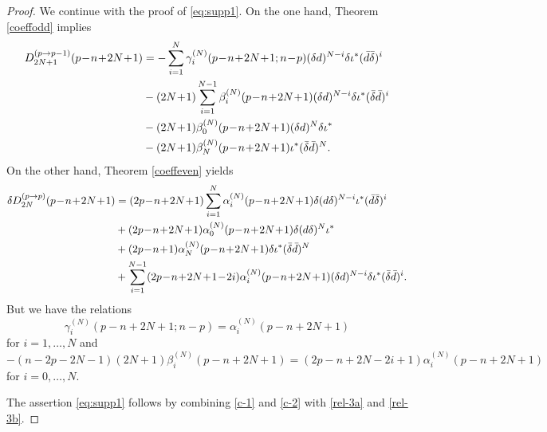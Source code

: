 \documentclass[a4paper,12pt,reqno]{amsart}
\numberwithin{theorem}{subsection}
\numberwithin{equation}{section}
\begin{document}
\begin{proof}
We continue with the proof of \eqref{eq:supp1}. On the one hand, Theorem
\ref{coeffodd} implies
\begin{align}\label{c-1}
   D_{2N+1}^{(p \to p-1)}(p\!-\!n\!+\!2N\!+\!1) & = -\sum_{i=1}^N \gamma_i^{(N)}(p\!-\!n\!+\!2N\!+\!1;n\!-\!p)
   (\delta {d})^{N-i} \delta \iota^* (\bar{d} \bar{\delta})^i \notag \\
   & - (2N\!+\!1) \sum_{i=1}^{N-1} \beta_i^{(N)}(p\!-\!n\!+\!2N\!+\!1)
   (\delta {d})^{N-i} \delta \iota^* (\bar{\delta} \bar{d})^i \notag \\
   & - (2N\!+\!1) \beta_0^{(N)}(p\!-\!n\!+\!2N\!+\!1) (\delta {d})^N \delta \iota^* \notag\\
   & - (2N\!+\!1) \beta_N^{(N)}(p\!-\!n\!+\!2N\!+\!1) \iota^* (\bar{\delta}
   \bar{d})^N.
\end{align}
On the other hand, Theorem \ref{coeffeven} yields
\begin{align}\label{c-2}
   \delta D_{2N}^{(p \to p)}(p\!-\!n\!+\!2N\!+\!1) & = (2p\!-\!n\!+\!2N\!+\!1) \sum_{i=1}^N
   \alpha_i^{(N)}(p\!-\!n\!+\!2N\!+\!1) \delta ({d} \delta)^{N-i} \iota^* (\bar{d} \bar{\delta})^i \notag \\
   & +  (2p\!-\!n\!+\!2N\!+\!1)  \alpha_0^{(N)}(p\!-\!n\!+\!2N\!+\!1) \delta ({d} \delta)^{N} \iota^* \notag \\
   & + (2p\!-\!n\!+\!1) \alpha_N^{(N)}(p\!-\!n\!+\!2N\!+\!1) \delta \iota^* (\bar{\delta} \bar{d})^N \\
   & + \sum_{i=1}^{N-1} (2p\!-\!n\!+\!2N\!+\!1\!-\!2i) \alpha_i^{(N)}(p\!-\!n\!+\!2N\!+\!1)
   (\delta {d})^{N-i} \delta \iota^*(\bar{\delta} \bar{d})^{i}. \notag
\end{align}
But we have the relations
\begin{equation}\label{rel-3a}
   \gamma_i^{(N)}(p\!-\!n\!+\!2N\!+\!1;n\!-\!p) = \alpha_i^{(N)}(p\!-\!n\!+\!2N\!+\!1)
\end{equation}
for $i=1,\dots,N$ and
\begin{equation}\label{rel-3b}
   -(n\!-\!2p\!-\!2N\!-\!1) (2N\!+\!1) \beta_i^{(N)}(p\!-\!n\!+\!2N\!+\!1)
   = (2p\!-\!n\!+\!2N\!-\!2i\!+\!1) \alpha_i^{(N)}(p\!-\!n\!+\!2N\!+\!1)
\end{equation}
for $i=0,\dots,N$.

The assertion \eqref{eq:supp1} follows by combining \eqref{c-1} and \eqref{c-2}
with \eqref{rel-3a} and \eqref{rel-3b}.


\end{proof}
\end{document}
